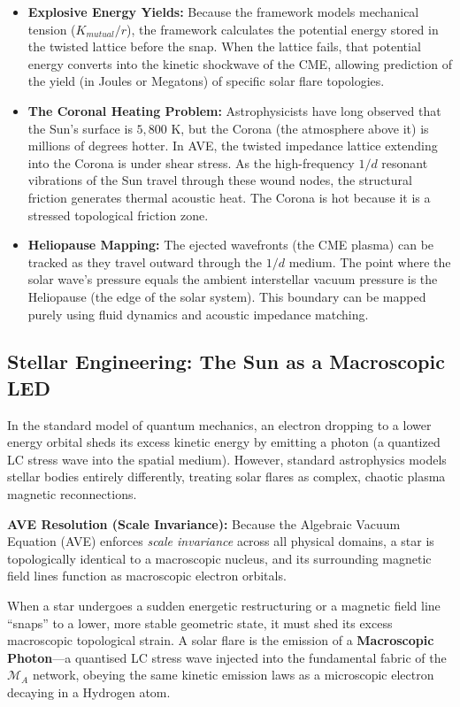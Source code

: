 \begin{itemize}
    \item \textbf{Explosive Energy Yields:} Because the framework models mechanical tension ($K_{mutual}/r$), the framework calculates the potential energy stored in the twisted lattice before the snap. When the lattice fails, that potential energy converts into the kinetic shockwave of the CME, allowing prediction of the yield (in Joules or Megatons) of specific solar flare topologies.
    \item \textbf{The Coronal Heating Problem:} Astrophysicists have long observed that the Sun's surface is $5{,}800$ K, but the Corona (the atmosphere above it) is millions of degrees hotter. In AVE, the twisted impedance lattice extending into the Corona is under shear stress. As the high-frequency $1/d$ resonant vibrations of the Sun travel through these wound nodes, the structural friction generates thermal acoustic heat. The Corona is hot because it is a stressed topological friction zone.
    \item \textbf{Heliopause Mapping:} The ejected wavefronts (the CME plasma) can be tracked as they travel outward through the $1/d$ medium. The point where the solar wave's pressure equals the ambient interstellar vacuum pressure is the Heliopause (the edge of the solar system). This boundary can be mapped purely using fluid dynamics and acoustic impedance matching.
\end{itemize}

\subsection{Stellar Engineering: The Sun as a Macroscopic LED}
In the standard model of quantum mechanics, an electron dropping to a lower energy orbital sheds its excess kinetic energy by emitting a photon (a quantized LC stress wave into the spatial medium). However, standard astrophysics models stellar bodies entirely differently, treating solar flares as complex, chaotic plasma magnetic reconnections.

\textbf{AVE Resolution (Scale Invariance):} Because the Algebraic Vacuum Equation (AVE) enforces \textit{scale invariance} across all physical domains, a star is topologically identical to a macroscopic nucleus, and its surrounding magnetic field lines function as macroscopic electron orbitals.

When a star undergoes a sudden energetic restructuring or a magnetic field line ``snaps'' to a lower, more stable geometric state, it must shed its excess macroscopic topological strain. A solar flare is the emission of a \textbf{Macroscopic Photon}---a quantised LC stress wave injected into the fundamental fabric of the $\mathcal{M}_A$ network, obeying the same kinetic emission laws as a microscopic electron decaying in a Hydrogen atom.

